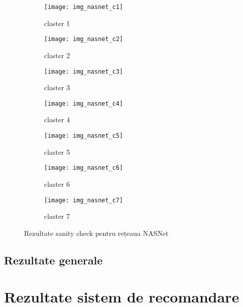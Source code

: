 \begin{figure}[!tbp]
  \centering
  \begin{subfigure}[b]{0.48\textwidth}
    \texttt{[image: img\_nasnet\_c1]}
    \caption{claster 1}
  \end{subfigure}
  \hfill
  \begin{subfigure}[b]{0.48\textwidth}
    \texttt{[image: img\_nasnet\_c2]}
    \caption{claster 2}
  \end{subfigure}
   \hfill
  \begin{subfigure}[b]{0.48\textwidth}
    \texttt{[image: img\_nasnet\_c3]}
    \caption{claster 3}
  \end{subfigure}
  \hfill
  \begin{subfigure}[b]{0.48\textwidth}
    \texttt{[image: img\_nasnet\_c4]}
    \caption{claster 4}
  \end{subfigure}
  \hfill
  \begin{subfigure}[b]{0.48\textwidth}
    \texttt{[image: img\_nasnet\_c5]}
    \caption{claster 5}
  \end{subfigure}
  \hfill
  \begin{subfigure}[b]{0.48\textwidth}
    \texttt{[image: img\_nasnet\_c6]}
    \caption{claster 6}
  \end{subfigure}
    \hfill
  \begin{subfigure}[b]{0.48\textwidth}
    \texttt{[image: img\_nasnet\_c7]}
    \caption{claster 7}
  \end{subfigure}
  \caption[Rezultate sanity check pentru rețeaua NASNet]{Rezultate sanity check pentru rețeaua NASNet}
\end{figure}

\subsection{Rezultate generale}

\section{Rezultate sistem de recomandare}
